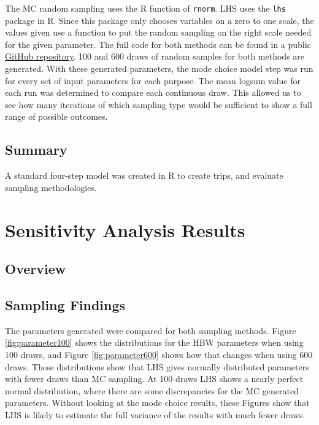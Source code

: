 \documentclass[fancy, masters,twoside]{byuthesis}
\begin{document}
The MC random sampling uses the R function of \texttt{rnorm}. LHS uses the \texttt{lhs} package in R. Since this package only chooses variables on a zero to one scale, the values given use a function to put the random sampling on the right scale needed for the given parameter. The full code for both methods can be found in a public \href{https://github.com/natmaegray/sensitivity_thesis}{GitHub repository}. 100 and 600 draws of random samples for both methods are generated. With these generated parameters, the mode choice model step was run for every set of input parameters for each purpose. The mean logsum value for each run was determined to compare each continuous draw. This allowed us to see how many iterations of which sampling type would be sufficient to show a full range of possible outcomes.

\hypertarget{summary-1}{%
\section{Summary}\label{summary-1}}

A standard four-step model was created in R to create trips, and evaluate sampling methodologies.

\hypertarget{sensitivity-analysis-results}{%
\chapter{Sensitivity Analysis Results}\label{sensitivity-analysis-results}}

\hypertarget{overview-2}{%
\section{Overview}\label{overview-2}}

\hypertarget{sampling-findings}{%
\section{Sampling Findings}\label{sampling-findings}}

The parameters generated were compared for both sampling methods. Figure \ref{fig:parameter100} shows the distributions for the HBW parameters when using 100 draws, and Figure \ref{fig:parameter600} shows how that changes when using 600 draws. These distributions show that LHS gives normally distributed parameters with fewer draws than MC sampling. At 100 draws LHS shows a nearly perfect normal distribution, where there are some discrepancies for the MC generated parameters. Without looking at the mode choice results, these Figures show that LHS is likely to estimate the full variance of the results with much fewer draws.
\end{document}
